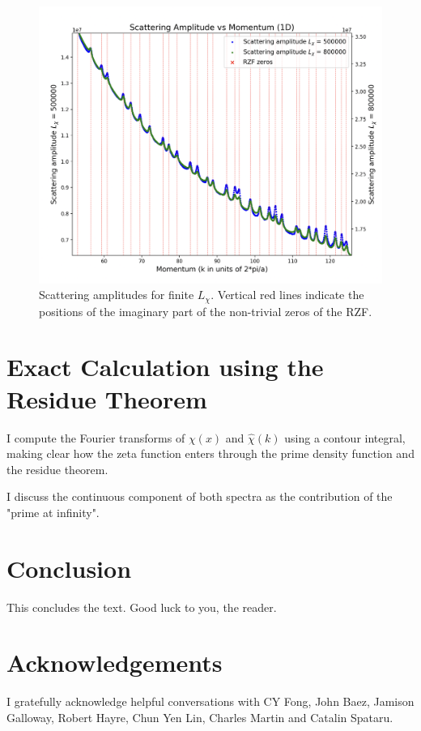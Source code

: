 \documentclass[11pt, oneside]{article}   	%
\begin{document}
\begin{figure}[htbp]
\begin{center}
    \includegraphics[width=0.8\linewidth]{../images/zoomed_scattering.png}
   
\caption{Scattering amplitudes for finite $L_{\chi}$. Vertical red lines indicate the positions of the imaginary part of the non-trivial zeros of the RZF.}
\label{default}
\end{center}
\end{figure}
 
\section{Exact Calculation using the Residue Theorem}

I compute the Fourier transforms of $\chi(x)$ and $\hat{\chi}(k)$ using a contour integral, making clear how the zeta function enters through the prime density function and the residue theorem.

I discuss the continuous component of both spectra as the contribution of the "prime at infinity".





\section{Conclusion}
This concludes the text. Good luck to you, the reader.
\section{Acknowledgements}
I gratefully acknowledge helpful conversations with CY Fong, John Baez, Jamison Galloway, Robert Hayre, Chun Yen Lin, Charles Martin and Catalin Spataru.
\end{document}
